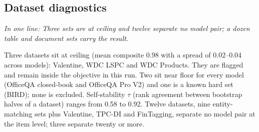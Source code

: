 \documentclass[11pt]{article}
\newcommand{\inoneline}[1]{\par\noindent\begingroup\small\textit{In one line: #1}\endgroup\par\medskip}
\begin{document}
\subsection{Dataset diagnostics}
\inoneline{Three sets are at ceiling and twelve separate no model pair; a dozen table and document sets carry the result.}
Three datasets sit at ceiling (mean composite 0.98 with a spread of 0.02--0.04 across models): Valentine, WDC LSPC and WDC Products. They are flagged and remain inside the objective in this run. Two sit near floor for every model (OfficeQA closed-book and OfficeQA Pro V2) and one is a known hard set (BIRD); none is excluded. Self-stability $\tau$ (rank agreement between bootstrap halves of a dataset) ranges from 0.58 to 0.92. Twelve datasets, nine entity-matching sets plus Valentine, TPC-DI and FinTagging, separate no model pair at the item level; three separate twenty or more.
\end{document}

